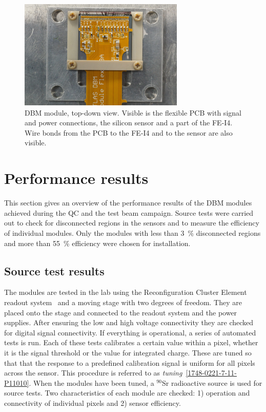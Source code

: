 \begin{figure}[!t]
\centering
\includegraphics[width=0.7\textwidth]{04_charge_monitoring/pics/mod1}
\caption{DBM module, top-down view. Visible is the flexible PCB with signal and power connections, the silicon sensor and a part of the FE-I4. Wire bonds from the PCB to the FE-I4 and to the sensor are also visible.}
\label{fig:completedmod}
\end{figure}



\section{Performance results}
\label{sec:perfresults}
This section gives an overview of the performance results of the DBM modules achieved during the QC and the test beam campaign. Source tests were carried out to check for disconnected regions in the sensors and to measure the efficiency of individual modules. Only the modules with less than 3~\% disconnected regions and more than 55~\% efficiency were chosen for installation. 


\subsection{Source test results}
The modules are tested in the lab using the Reconfiguration Cluster Element readout system~\cite{Claus:2021543} and a moving stage with two degrees of freedom. They are placed onto the stage and connected to the readout system and the power supplies. After ensuring the low and high voltage connectivity they are checked for digital signal connectivity. If everything is operational, a series of automated tests is run. Each of these tests calibrates a certain value within a pixel, whether it is the signal threshold or the value for integrated charge. These are tuned so that that the response to a predefined calibration signal is uniform for all pixels across the sensor. This procedure is referred to as \emph{tuning}~\ref{1748-0221-7-11-P11010}. When the modules have been tuned, a $^{90}$Sr radioactive source is used for source tests. Two characteristics of each module are checked: 1) operation and connectivity of individual pixels and 2) sensor efficiency. 

